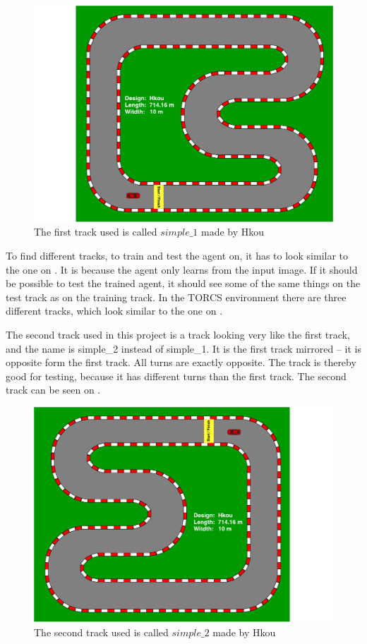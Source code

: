 \begin{figure}[H]
	\centering
	\includegraphics[width=1\textwidth]{Figures/Result/track_simple_1.pdf}
	\caption{The first track used is called $simple\_1$ made by Hkou}
	\label{fig:track_simple_1}
\end{figure}

To find different tracks, to train and test the agent on, it has to look similar to the one on . It is because the agent only learns from the input image. If it should be possible to test the trained agent, it should see some of the same things on the test track as on the training track. In the TORCS environment there are three different tracks, which look similar to the one on . 

The second track used in this project is a track looking very like the first track, and the name is simple\_2 instead of simple\_1. It is the first track mirrored – it is opposite form the first track. All turns are exactly opposite. The track is thereby good for testing, because it has different turns than the first track. The second track can be seen on . 

\begin{figure}[H]
	\centering
	\includegraphics[width=1\textwidth]{Figures/Result/track_simple_2.pdf}
	\caption{The second track used is called $simple\_2$ made by Hkou}
	\label{fig:track_simple_2}
\end{figure}

